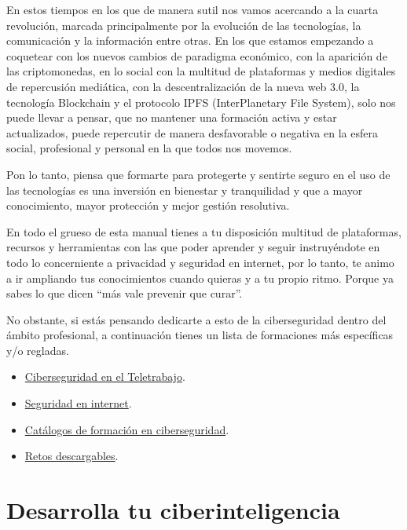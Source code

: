 \documentclass[
  a4paper,
  openany]{book}
\begin{document}
En estos tiempos en los que de manera sutil nos vamos acercando a la cuarta revolución, marcada principalmente por la evolución de las tecnologías, la comunicación y la información entre otras. En los que estamos empezando a coquetear con los nuevos cambios de paradigma económico, con la aparición de las criptomonedas, en lo social con la multitud de plataformas y medios digitales de repercusión mediática, con la descentralización de la nueva web 3.0, la tecnología Blockchain y el protocolo IPFS (InterPlanetary File System), solo nos puede llevar a pensar, que no mantener una formación activa y estar actualizados, puede repercutir de manera desfavorable o negativa en la esfera social, profesional y personal en la que todos nos movemos.

Pon lo tanto, piensa que formarte para protegerte y sentirte seguro en el uso de las tecnologías es una inversión en bienestar y tranquilidad y que a mayor conocimiento, mayor protección y mejor gestión resolutiva.

En todo el grueso de esta manual tienes a tu disposición multitud de plataformas, recursos y herramientas con las que poder aprender y seguir instruyéndote en todo lo concerniente a privacidad y seguridad en internet, por lo tanto, te animo a ir ampliando tus conocimientos cuando quieras y a tu propio ritmo. Porque ya sabes lo que dicen ``más vale prevenir que curar''.

No obstante, si estás pensando dedicarte a esto de la ciberseguridad dentro del ámbito profesional, a continuación tienes un lista de formaciones más específicas y/o regladas.

\begin{itemize}
\item
  \href{https://learndigital.withgoogle.com/activate/course/cybersecurity-remote-work}{Ciberseguridad en el Teletrabajo}.
\item
  \href{https://www.cualifica2.es/cursos/Curso-Seguridad-En-Internet}{Seguridad en internet}.
\item
  \href{https://www.incibe.es/catalogos-formacion-ciberseguridad}{Catálogos de formación en ciberseguridad}.
\item
  \href{https://www.incibe.es/academiahacker/retosdescargables}{Retos descargables}.
\end{itemize}

\hypertarget{desarrolla-tu-ciberinteligencia}{%
\section{Desarrolla tu ciberinteligencia}\label{desarrolla-tu-ciberinteligencia}}
\end{document}
